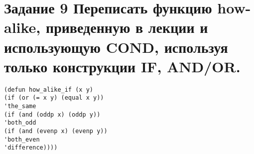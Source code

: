 \section{Задание 9 Переписать функцию how-alike, приведенную в лекции и использующую COND, используя
	только конструкции IF, AND/OR.}
\begin{center}
	\begin{lstlisting}[label=a11, caption={Выражение 11}]
(defun how_alike_if (x y)
(if (or (= x y) (equal x y))
'the_same
(if (and (oddp x) (oddp y))
'both_odd
(if (and (evenp x) (evenp y))
'both_even
'difference))))
	\end{lstlisting}
\end{center}